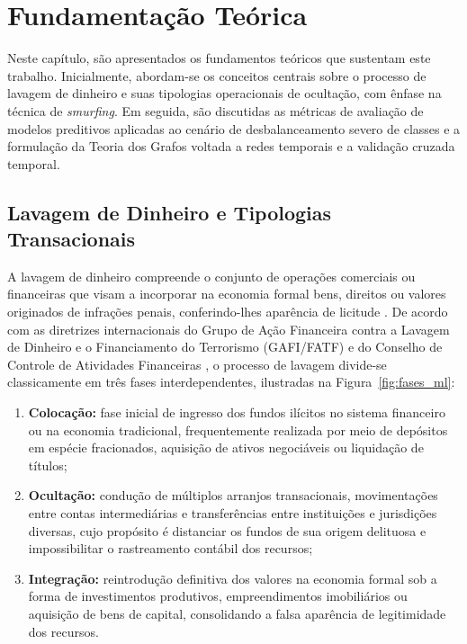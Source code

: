 \documentclass[titlepage,a4paper,oneside,onecolumn,12pt]{report}
\begin{document}
\chapter{Fundamentação Teórica}

Neste capítulo, são apresentados os fundamentos teóricos que sustentam este trabalho. Inicialmente, abordam-se os conceitos centrais sobre o processo de lavagem de dinheiro e suas tipologias operacionais de ocultação, com ênfase na técnica de \textit{smurfing}. Em seguida, são discutidas as métricas de avaliação de modelos preditivos aplicadas ao cenário de desbalanceamento severo de classes e a formulação da Teoria dos Grafos voltada a redes temporais e a validação cruzada temporal.

\section{Lavagem de Dinheiro e Tipologias Transacionais}
\label{sec:aml_tipologias}

A lavagem de dinheiro compreende o conjunto de operações comerciais ou financeiras que visam a incorporar na economia formal bens, direitos ou valores originados de infrações penais, conferindo-lhes aparência de licitude \cite{coaf2021cartilha}. De acordo com as diretrizes internacionais do Grupo de Ação Financeira contra a Lavagem de Dinheiro e o Financiamento do Terrorismo (GAFI/FATF) e do Conselho de Controle de Atividades Financeiras \cite{coaf2021cartilha, fatf2018concealment}, o processo de lavagem divide-se classicamente em três fases interdependentes, ilustradas na Figura~\ref{fig:fases_ml}:

\begin{enumerate}
    \item \textbf{Colocação:} fase inicial de ingresso dos fundos ilícitos no sistema financeiro ou na economia tradicional, frequentemente realizada por meio de depósitos em espécie fracionados, aquisição de ativos negociáveis ou liquidação de títulos;
    \item \textbf{Ocultação:} condução de múltiplos arranjos transacionais, movimentações entre contas intermediárias e transferências entre instituições e jurisdições diversas, cujo propósito é distanciar os fundos de sua origem delituosa e impossibilitar o rastreamento contábil dos recursos;
    \item \textbf{Integração:} reintrodução definitiva dos valores na economia formal sob a forma de investimentos produtivos, empreendimentos imobiliários ou aquisição de bens de capital, consolidando a falsa aparência de legitimidade dos recursos.
\end{enumerate}
\end{document}
